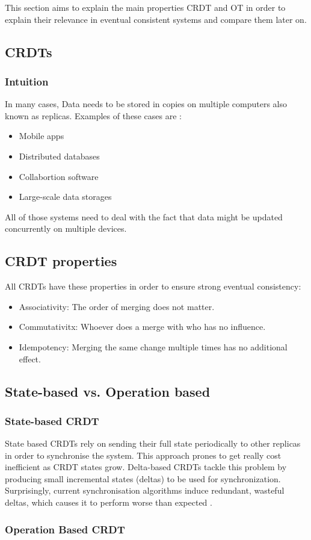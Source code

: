 This section aims to explain the main properties CRDT and OT in order to explain
their relevance in eventual consistent systems and compare them later on.

\subsection{CRDTs}

\subsubsection{Intuition}

In many cases, Data needs to be stored in copies on multiple computers also 
known as replicas. Examples of these cases are \cite{CRDT_Overview}:

\begin{itemize}
    \item Mobile apps
    \item Distributed databases
    \item Collabortion software
    \item Large-scale data storages
\end{itemize}

All of those systems need to deal with the fact that data might be updated 
concurrently on multiple devices.

\subsection{CRDT properties}

All CRDTs have these properties in order to ensure strong eventual consistency:

\begin{itemize}
    \item Associativity: The order of merging does not matter.
    \item Commutativitx: Whoever does a merge with who has no influence.
    \item Idempotency: Merging the same change multiple times has no additional effect.
\end{itemize}

\subsection{State-based vs. Operation based}

\subsubsection{State-based CRDT}
State based CRDTs rely on sending their full state periodically to other
replicas in order to synchronise the system. This approach prones to get 
really cost inefficient as CRDT states grow. Delta-based CRDTs tackle this problem
by producing small incremental states (deltas) to be used for synchronization. Surprisingly,
current synchronisation algorithms induce redundant, wasteful deltas, which causes it to 
perform worse than expected \cite{Stateful_delta}. 

\subsubsection{Operation Based CRDT}



